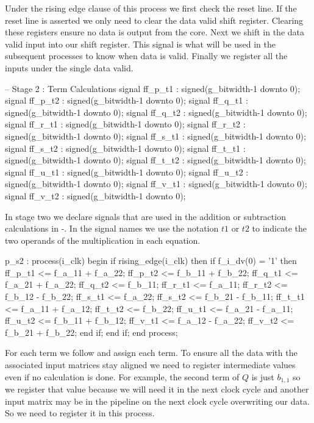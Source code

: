 Under the rising edge clause of this process we first check the reset line. If the reset line is asserted we only need to clear the data valid shift register. Clearing these registers ensure no data is output from the core. Next we shift in the data valid input into our shift register. This signal is what will be used in the subsequent processes to know when data is valid. Finally we register all the inputs under the single data valid. 

\begin{VHDLlisting}[tabsize=2]
-- Stage 2 : Term Calculations
signal ff_p_t1 : signed(g_bitwidth-1 downto 0);
signal ff_p_t2 : signed(g_bitwidth-1 downto 0);
signal ff_q_t1 : signed(g_bitwidth-1 downto 0);
signal ff_q_t2 : signed(g_bitwidth-1 downto 0);
signal ff_r_t1 : signed(g_bitwidth-1 downto 0);
signal ff_r_t2 : signed(g_bitwidth-1 downto 0);
signal ff_s_t1 : signed(g_bitwidth-1 downto 0);
signal ff_s_t2 : signed(g_bitwidth-1 downto 0);
signal ff_t_t1 : signed(g_bitwidth-1 downto 0);
signal ff_t_t2 : signed(g_bitwidth-1 downto 0);
signal ff_u_t1 : signed(g_bitwidth-1 downto 0);
signal ff_u_t2 : signed(g_bitwidth-1 downto 0);
signal ff_v_t1 : signed(g_bitwidth-1 downto 0);
signal ff_v_t2 : signed(g_bitwidth-1 downto 0);
\end{VHDLlisting} 

In stage two we declare signals that are used in the addition or subtraction calculations in -. In the signal names we use the notation $t1$ or $t2$ to indicate the two operands of the multiplication in each equation. 

\begin{VHDLlisting}[tabsize=2]
p_s2 : process(i_clk)
    begin
        if rising_edge(i_clk) then
            if f_i_dv(0) = '1' then
                ff_p_t1 <= f_a_11 + f_a_22;
                ff_p_t2 <= f_b_11 + f_b_22;
                ff_q_t1 <= f_a_21 + f_a_22;
                ff_q_t2 <= f_b_11;
                ff_r_t1 <= f_a_11;
                ff_r_t2 <= f_b_12 - f_b_22;
                ff_s_t1 <= f_a_22;
                ff_s_t2 <= f_b_21 - f_b_11;
                ff_t_t1 <= f_a_11 + f_a_12;
                ff_t_t2 <= f_b_22;
                ff_u_t1 <= f_a_21 - f_a_11;
                ff_u_t2 <= f_b_11 + f_b_12;
                ff_v_t1 <= f_a_12 - f_a_22;
                ff_v_t2	<= f_b_21 + f_b_22;
            end if;
        end if;
    end process;
\end{VHDLlisting}

For each term we follow  and assign each term. To ensure all the data with the associated input matrices stay aligned we need to register intermediate values even if no calculation is done. For example, the second term of $Q$ is just $b_{1,1}$ so we register that value because we will need it in the next clock cycle and another input matrix may be in the pipeline on the next clock cycle overwriting our data. So we need to register it in this process.

